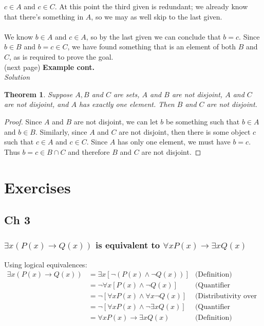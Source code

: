 \documentclass{report}
\newtheorem*{theorem}{Theorem}
\theoremstyle{definition}
\begin{document}
$c\in A$ and $c\in C$. At this point the third given is redundant; we already know that there's something in $A$, so we may as well skip to the last given.\\
\vspace{1mm}\\
We know $b\in A$ and $c\in A$, so by the last given we can conclude that $b=c$. Since $b\in B$ and $b=c\in C$, we have found something that is an element of both $B$ and $C$, as is required to 
prove the goal.\\
(next page)\newpage
\noindent\textbf{Example cont.}\\
\textit{Solution}
\begin{theorem}
Suppose $A,B$ and $C$ are sets, $A$ and $B$ are not disjoint, $A$ and $C$ are not disjoint, and $A$ has exactly one element. Then $B$ and $C$ are not disjoint.
\end{theorem}
\begin{proof}
Since $A$ and $B$ are not disjoint, we can let $b$ be something such that $b\in A$ and $b\in B$. Similarly, since $A$ and $C$ are not disjoint, then there is some object $c$ such that $c\in A$ and
$c\in C$. Since $A$ has only one element, we must have $b=c$. Thus $b=c\in B\cap C$ and therefore $B$ and $C$ are not disjoint.
\end{proof}








\appendix
\chapter{Exercises}
\section{Ch 3}
\subsection{$\exists x(P(x)\to Q(x))$ is equivalent to $\forall xP(x)\to\exists xQ(x)$}
Using logical equivalences:
\begin{align*}
\exists x(P(x)\to Q(x))&=\exists x[\neg(P(x)\land\neg Q(x))]&\text{(Definition)}\\
&=\neg\forall x[P(x)\land\neg Q(x)]&\text{(Quantifier negation)}\\
&=\neg[\forall xP(x)\land\forall x\neg Q(x)]&\text{(Distributivity over conjuction)}\\
&=\neg[\forall xP(x)\land\neg\exists xQ(x)]&\text{(Quantifier negation)}\\
&=\forall xP(x)\to\exists xQ(x)&\text{(Definition)}
\end{align*}
\end{document}
